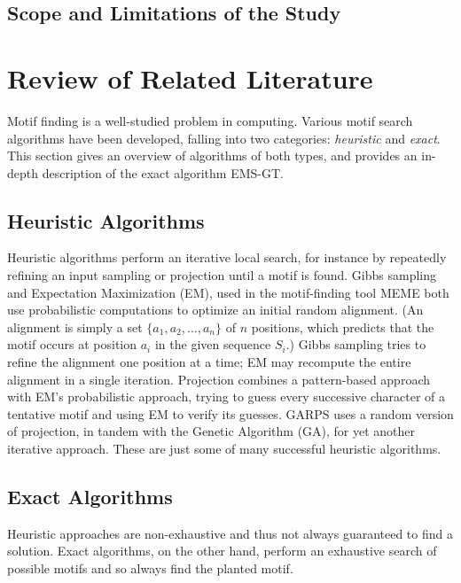 \documentclass[oneside,12pt]{DISCSthesis}
\begin{document}
	\section{Scope and Limitations of the Study}


\chapter{Review of Related Literature}
	Motif finding is a well-studied problem in computing. Various motif search algorithms have been developed,
	falling into two categories: \emph{heuristic} and \emph{exact}. This section gives an overview of algorithms
	of both types, and provides an in-depth description of the exact algorithm EMS-GT.
	
	\section{Heuristic Algorithms}
		Heuristic algorithms perform an iterative local search, for instance by repeatedly refining an input sampling or projection until a motif is found. Gibbs sampling \cite{lawrence1993detecting} and Expectation Maximization (EM), used in the motif-finding tool MEME \cite{lawrence1990expectation,bailey1995unsupervised} both use probabilistic computations to optimize an initial random alignment. (An alignment is simply a set $\{a_{1}, a_{2},...,a_{n}\}$ of $n$ positions, which predicts that the motif occurs at position $a_{i}$ in the given sequence $S_{i}$.) Gibbs sampling tries to refine the alignment one position at a time; %
		EM may recompute the entire alignment in a single iteration. Projection \cite{blanchette2002discovery} combines a pattern-based approach with EM's probabilistic approach, trying to guess every successive character of a tentative motif and using EM to verify its guesses. GARPS \cite{huo2009combining} uses a random version of projection, in tandem with the Genetic Algorithm (GA), for yet another iterative approach. These are just some of many successful heuristic algorithms.

	\section{Exact Algorithms}
		Heuristic approaches are non-exhaustive and thus not always guaranteed to find a solution. Exact algorithms, on the other hand, perform an exhaustive search of possible motifs and so always find the planted motif.
\end{document}

